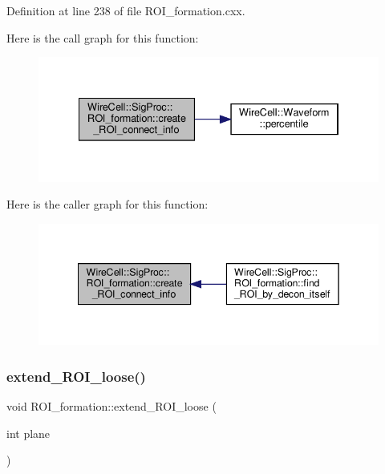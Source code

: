 Definition at line 238 of file R\+O\+I\+\_\+formation.\+cxx.

Here is the call graph for this function\+:
\nopagebreak
\begin{figure}[H]
\begin{center}
\leavevmode
\includegraphics[width=334pt]{class_wire_cell_1_1_sig_proc_1_1_r_o_i__formation_a9d634c399cbd39c902a0f84b25ae192f_cgraph}
\end{center}
\end{figure}
Here is the caller graph for this function\+:
\nopagebreak
\begin{figure}[H]
\begin{center}
\leavevmode
\includegraphics[width=342pt]{class_wire_cell_1_1_sig_proc_1_1_r_o_i__formation_a9d634c399cbd39c902a0f84b25ae192f_icgraph}
\end{center}
\end{figure}
\mbox{\label{class_wire_cell_1_1_sig_proc_1_1_r_o_i__formation_aadada4e6a77ac41217a7b8858b26355f}} 
\subsubsection{\texorpdfstring{extend\+\_\+\+R\+O\+I\+\_\+loose()}{extend\_ROI\_loose()}}
{\footnotesize\ttfamily void R\+O\+I\+\_\+formation\+::extend\+\_\+\+R\+O\+I\+\_\+loose (\begin{DoxyParamCaption}\item[{int}]{plane }\end{DoxyParamCaption})}



